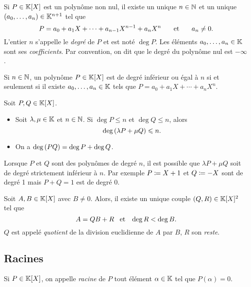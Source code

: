 \documentclass{magnolia}
\begin{document}
\begin{definition}
Si $P\in\polyK$ est un polynôme non nul, il existe un unique $n\in\mathbb{N}$ et
un unique $\left(a_0,\ldots,a_n\right)\in\mathbb{K}^{n+1}$ tel que
\[P=a_0 + a_1 X + \cdots +  a_{n-1} X^{n-1} + a_n X^n \quad\quad\!\text{et}\quad\!\quad a_n\neq 0.\]
L'entier $n$ s'appelle le \emph{degré} de $P$ et est noté $\deg P$. Les éléments $a_0,\ldots,a_n\in\mathbb{K}$
sont ses \emph{coefficients}. Par convention, on dit que le degré du polynôme nul est $-\infty$.
\end{definition}

\begin{remarqueUnique}
\remarque Si $n\in\mathbb{N}$, un polynôme $P\in\polyK$ est de degré inférieur ou égal à $n$
  si et seulement si il existe $a_0,\ldots,a_n\in\mathbb{K}$ tels que
  $P=a_0+a_1 X+\cdots+a_n X^n$.
\end{remarqueUnique}

\begin{proposition}
Soit $P,Q\in\polyK$.
\begin{itemize}
\item Soit $\lambda,\mu\in\mathbb{K}$ et $n\in\mathbb{N}$. Si $\deg P\leq n$ et $\deg Q\leq n$, alors
  \[\deg\left(\lambda P+\mu Q\right)\leqslant n.\]
\item On a $\deg\left(PQ\right)=\deg P+\deg Q$.
\end{itemize}
\end{proposition}

\begin{remarqueUnique}
\remarque Lorsque $P$ et $Q$ sont des polynômes de degré $n$, il est possible que
  $\lambda P+\mu Q$ soit de degré strictement inférieur à $n$. Par exemple $P\coloneqq X+1$ et
  $Q\coloneqq -X$ sont de degré 1 mais $P+Q=1$ est de degré 0.
\end{remarqueUnique}

\begin{definition}
Soit $A,B\in\polyK$ avec $B\neq 0$. Alors, il existe un unique couple
$\p{Q,R}\in\polyK^2$ tel que
\[A=QB+R \quad\!\text{et}\quad\! \deg R<\deg B.\]
$Q$ est appelé \emph{quotient} de la division euclidienne de $A$ par $B$, $R$ son
\emph{reste}.
\end{definition}

\subsection{Racines}

\begin{definition}
Si $P\in\polyK$, on appelle \emph{racine} de $P$ tout élément $\alpha\in\mathbb{K}$ tel que $P(\alpha)=0$.
\end{definition}
\end{document}

